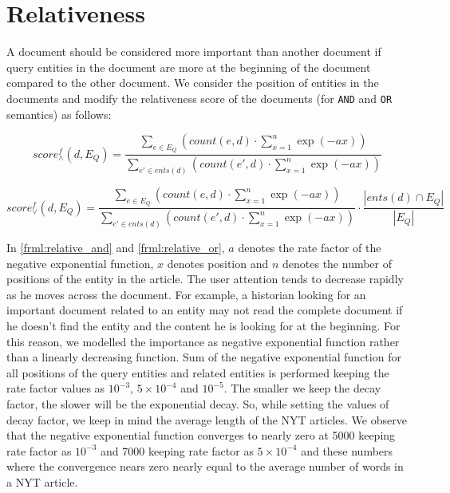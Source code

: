 \documentclass[10pt,a4paper]{article} %
\begin{document}
    \title{\rmfamily{}}
    \author{}
    \date{\vspace{-5ex}}
    
    \maketitle
    
    \section{Relativeness}
    
    A document should be considered more important than another document if query entities in the document
    are more at the beginning of the document compared to the other document.
    We consider the position of entities in the documents and modify the relativeness 
    score of the documents (for {\tt AND} and {\tt OR} semantics) as follows: 
    
    \begin{equation}
    \label{frml:relative_and}
    score^{f}_{\wedge}(d, E_Q) = \frac{\sum_{e \in E_Q}{(count(e, d) \cdot \sum\limits_{x=1}^n{}{\exp(-ax)})}}{\sum_{e' \in ents(d)}{(count(e', d) \cdot \sum\limits_{x=1}^n{}{}{\exp(-ax)})}}
    \end{equation}

    \begin{equation}
    \label{frml:relative_or}
    score^{f}_{\vee}(d, E_Q) = \frac{\sum_{e \in E_Q}{(count(e, d) \cdot \sum\limits_{x=1}^n{}{\exp(-ax)})}}{\sum_{e' \in ents(d)}{(count(e', d) \cdot \sum\limits_{x=1}^n{}{\exp(-ax)})}} \cdot \frac{|ents(d) \cap E_Q|}{|E_Q|}
    \end{equation}

    \noindent In \ref{frml:relative_and} and \ref{frml:relative_or}, $a$ denotes the rate factor of the negative 
    exponential function, $x$ denotes position and $n$ denotes the number of positions of the entity in the article. 
    The user attention tends to decrease rapidly as he moves across the document. 
    For example, a historian looking for an important document related to an entity may not read the complete document if he doesn't find the entity and the content he is looking for at the beginning. 
    For this reason, we modelled the importance as negative exponential 
    function rather than a linearly decreasing function.
    Sum of the negative exponential function for all positions of the query entities and related entities is performed
    keeping the rate factor values as $10^{-3}$, $5 \times 10^{-4}$ and $10^{-5}$. 
    The smaller we keep the decay factor, the slower will be the exponential decay. 
    So, while setting the values of decay factor, we keep in mind the average length of the NYT articles. 
    We observe that the negative exponential function converges to nearly zero at 5000 keeping rate factor as $10^{-3}$ and 7000 keeping rate factor as $5 \times 10^{-4}$ and these numbers where the convergence nears zero nearly equal to the average number of words in a NYT article. 
    
\end{document}
